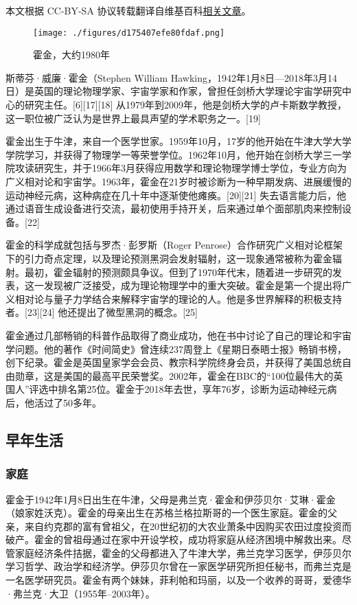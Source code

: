 
本文根据 CC-BY-SA 协议转载翻译自维基百科\href{https://en.wikipedia.org/wiki/Stephen_Hawking}{相关文章}。

\begin{figure}[ht]
\centering
\texttt{[image: ./figures/d175407efe80fdaf.png]}
\caption{霍金，大约1980年} \label{fig_HJ_1}
\end{figure}
斯蒂芬·威廉·霍金（Stephen William Hawking，1942年1月8日—2018年3月14日）是英国的理论物理学家、宇宙学家和作家，曾担任剑桥大学理论宇宙学研究中心的研究主任。[6][17][18] 从1979年到2009年，他是剑桥大学的卢卡斯数学教授，这一职位被广泛认为是世界上最具声望的学术职务之一。[19]

霍金出生于牛津，来自一个医学世家。1959年10月，17岁的他开始在牛津大学大学学院学习，并获得了物理学一等荣誉学位。1962年10月，他开始在剑桥大学三一学院攻读研究生，并于1966年3月获得应用数学和理论物理学博士学位，专业方向为广义相对论和宇宙学。1963年，霍金在21岁时被诊断为一种早期发病、进展缓慢的运动神经元病，这种病症在几十年中逐渐使他瘫痪。[20][21] 失去语言能力后，他通过语音生成设备进行交流，最初使用手持开关，后来通过单个面部肌肉来控制设备。[22]

霍金的科学成就包括与罗杰·彭罗斯（Roger Penrose）合作研究广义相对论框架下的引力奇点定理，以及理论预测黑洞会发射辐射，这一现象通常被称为霍金辐射。最初，霍金辐射的预测颇具争议。但到了1970年代末，随着进一步研究的发表，这一发现被广泛接受，成为理论物理学中的重大突破。霍金是第一个提出将广义相对论与量子力学结合来解释宇宙学的理论的人。他是多世界解释的积极支持者。[23][24] 他还提出了微型黑洞的概念。[25]

霍金通过几部畅销的科普作品取得了商业成功，他在书中讨论了自己的理论和宇宙学问题。他的著作《时间简史》曾连续237周登上《星期日泰晤士报》畅销书榜，创下纪录。霍金是英国皇家学会会员、教宗科学院终身会员，并获得了美国总统自由勋章，这是美国的最高平民荣誉奖。2002年，霍金在BBC的“100位最伟大的英国人”评选中排名第25位。霍金于2018年去世，享年76岁，诊断为运动神经元病后，他活过了50多年。
\subsection{早年生活} 
\subsubsection{家庭}  
霍金于1942年1月8日出生在牛津，父母是弗兰克·霍金和伊莎贝尔·艾琳·霍金（娘家姓沃克）。霍金的母亲出生在苏格兰格拉斯哥的一个医生家庭。霍金的父亲，来自约克郡的富有曾祖父，在20世纪初的大农业萧条中因购买农田过度投资而破产。霍金的曾祖母通过在家中开设学校，成功将家庭从经济困境中解救出来。尽管家庭经济条件拮据，霍金的父母都进入了牛津大学，弗兰克学习医学，伊莎贝尔学习哲学、政治学和经济学。伊莎贝尔曾在一家医学研究所担任秘书，而弗兰克是一名医学研究员。霍金有两个妹妹，菲利帕和玛丽，以及一个收养的哥哥，爱德华·弗兰克·大卫（1955年–2003年）。

